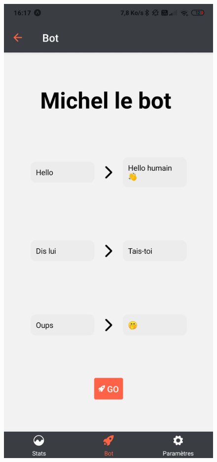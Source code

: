 \documentclass{article}
\begin{document}
\begin{figure}[h!]
\includegraphics[scale=0.1]{images/recap_bot_reponse.jpg}

\end{figure}
\end{document}
